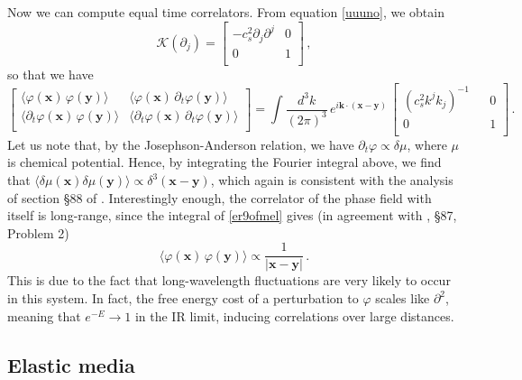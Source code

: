 \documentclass[a4paper, amsfonts, amssymb, amsmath, reprint, showkeys, nofootinbib, twoside,notitlepage,onecolumn,preprintnumbers]{revtex4-2}
\theoremstyle{definition}
\theoremstyle{theorem}
\theoremstyle{corollary}
\begin{document}
Now we can compute equal time correlators. From equation \eqref{uuuno}, we obtain
\begin{equation}
    \mathcal{K}(\partial_j)= 
    \begin{bmatrix}
      -c_s^2 \partial_j \partial^j  &  0 \\
       0 &  1 \\
    \end{bmatrix} \, ,
\end{equation}
so that we have
\begin{equation}\label{er9ofmel}
\begin{bmatrix}
      \langle \varphi(\textbf{x}) \, \varphi(\textbf{y}) \rangle   &  \langle \varphi(\textbf{x}) \, \partial_t \varphi(\textbf{y}) \rangle\\
   \langle \partial_t \varphi(\textbf{x}) \, \varphi(\textbf{y}) \rangle  & \langle \partial_t  \varphi(\textbf{x}) \, \partial_t \varphi(\textbf{y}) \rangle \\
\end{bmatrix}
     = \int \dfrac{d^3 k}{(2\pi)^3} \, e^{i\textbf{k}\cdot (\textbf{x}-\textbf{y})} \, \begin{bmatrix}
         (c_s^2 k^j k_j)^{{-}1} & & 0 \\
         0 & & 1 \\
     \end{bmatrix} \, .
\end{equation}
Let us note that, by the Josephson-Anderson relation, we have $\partial_t \varphi \propto \delta \mu$, where $\mu$ is chemical potential. Hence, by integrating the Fourier integral above, we find that $\langle \delta \mu(\textbf{x})\delta \mu(\textbf{y})\rangle\propto \delta^3(\textbf{x}-\textbf{y})$, which again is consistent with the analysis of section \S 88 of \cite{landau9}. Interestingly enough, the correlator of the phase field with itself is long-range, since the integral of \eqref{er9ofmel} gives (in agreement with \cite{landau9}, \S 87, Problem 2)
\begin{equation}\label{U1U}
     \langle \varphi(\textbf{x}) \, \varphi(\textbf{y}) \rangle  \propto \dfrac{1}{ |\textbf{x}-\textbf{y}|} \, .
\end{equation}
This is due to the fact that long-wavelength fluctuations are very likely to occur in this system. In fact, the free energy cost of a perturbation to $\varphi$ scales like $\partial^2$, meaning that $e^{-E}\rightarrow 1$ in the IR limit, inducing correlations over large distances.


\subsection{Elastic media}
\end{document}
